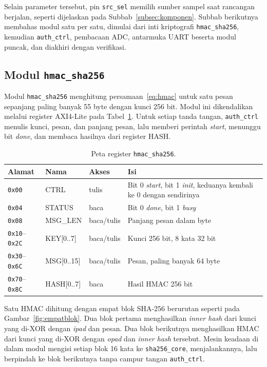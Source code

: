 \documentclass[11pt,a4paper]{article}
\begin{document}
Selain parameter tersebut, pin \texttt{src\_sel} memilih sumber sampel saat rancangan berjalan,
seperti dijelaskan pada Subbab~\ref{subsec:komponen}. Subbab berikutnya membahas modul satu per
satu, dimulai dari inti kriptografi \texttt{hmac\_sha256}, kemudian \texttt{auth\_ctrl},
pembacaan ADC, antarmuka UART beserta modul puncak, dan diakhiri dengan verifikasi.

\subsection{Modul \texttt{hmac\_sha256}}
\label{subsec:modulhmac}

Modul \texttt{hmac\_sha256} menghitung persamaan~\eqref{eq:hmac} untuk satu pesan sepanjang
paling banyak 55 byte dengan kunci 256 bit. Modul ini dikendalikan melalui register AXI4-Lite
pada Tabel~\ref{tab:reghmac}. Untuk setiap tanda tangan, \texttt{auth\_ctrl} menulis kunci,
pesan, dan panjang pesan, lalu memberi perintah \textit{start}, menunggu bit \textit{done}, dan
membaca hasilnya dari register HASH.

\begin{table}[H]
  \centering
  \small
  \begin{tabularx}{\textwidth}{l l l X}
    \toprule
    Alamat & Nama & Akses & Isi \\
    \midrule
    \texttt{0x00} & CTRL & tulis & Bit 0 \textit{start}, bit 1 \textit{init}, keduanya kembali ke 0
      dengan sendirinya \\
    \texttt{0x04} & STATUS & baca & Bit 0 \textit{done}, bit 1 \textit{busy} \\
    \texttt{0x08} & MSG\_LEN & baca/tulis & Panjang pesan dalam byte \\
    \texttt{0x10}--\texttt{0x2C} & KEY[0..7] & baca/tulis & Kunci 256 bit, 8 kata 32 bit \\
    \texttt{0x30}--\texttt{0x6C} & MSG[0..15] & baca/tulis & Pesan, paling banyak 64 byte \\
    \texttt{0x70}--\texttt{0x8C} & HASH[0..7] & baca & Hasil HMAC 256 bit \\
    \bottomrule
  \end{tabularx}
  \caption{Peta register \texttt{hmac\_sha256}.}
  \label{tab:reghmac}
\end{table}

Satu HMAC dihitung dengan empat blok SHA-256 berurutan seperti pada Gambar~\ref{fig:empatblok}.
Dua blok pertama menghasilkan \textit{inner hash} dari kunci yang di-XOR dengan \textit{ipad} dan
pesan. Dua blok berikutnya menghasilkan HMAC dari kunci yang di-XOR dengan \textit{opad} dan
\textit{inner hash} tersebut. Mesin keadaan di dalam modul mengisi setiap blok 16 kata ke
\texttt{sha256\_core}, menjalankannya, lalu berpindah ke blok berikutnya tanpa campur tangan
\texttt{auth\_ctrl}.
\end{document}
